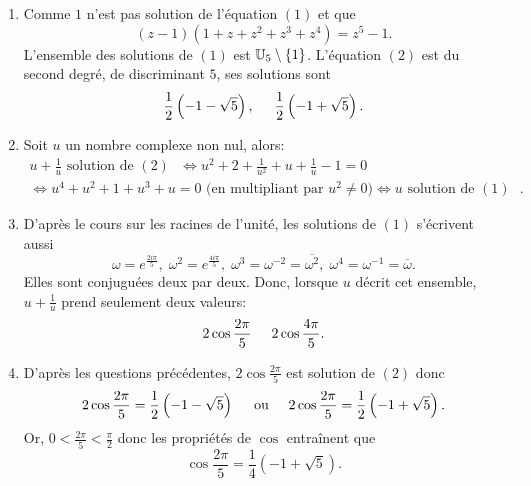\begin{enumerate}
  \item Comme $1$ n'est pas solution de l'équation $(1)$ et que
\begin{displaymath}
  (z-1)(1+z+z^2+z^3+z^4)=z^5 - 1.
\end{displaymath}
L'ensemble des solutions de $(1)$ est $\mathbb{U}_5 \setminus\{1\}$.\newline
L'équation $(2)$ est du second degré, de discriminant $5$, ses solutions sont
\begin{displaymath}
  \frac{1}{2}\left(-1-\sqrt{5} \right),\hspace{0.5cm} \frac{1}{2}\left(-1+\sqrt{5} \right).
\end{displaymath}

  \item Soit $u$ un nombre complexe non nul, alors:
\begin{multline*}
u+\frac{1}{u}\text{ solution de $(2)$ }
\Leftrightarrow
u^2+2+\frac{1}{u^2}+u+\frac{1}{u}-1=0 \\
\Leftrightarrow u^4 +u^2+ 1 + u^3 +u =0 \text{ (en multipliant par }u^2\neq 0) 
\Leftrightarrow u\text{ solution de $(1)$ }.
\end{multline*}

  \item D'après le cours sur les racines de l'unité, les solutions de $(1)$ s'écrivent aussi
  \begin{displaymath}
    \omega = e^{\frac{2i\pi}{5}},\; \omega^2= e^{\frac{4i\pi}{5}},\; \omega^3=\omega^{-2}=\overline{\omega^2},\; \omega^4=\omega^{-1}=\overline{\omega}.
  \end{displaymath}
Elles sont conjuguées deux par deux. Donc, lorsque $u$ décrit cet ensemble, $u+\frac{1}{u}$ prend seulement deux valeurs:
\begin{displaymath}
  2\cos \frac{2\pi}{5}\hspace{0.5cm} 2\cos \frac{4\pi}{5}.
\end{displaymath}

  \item D'après les questions précédentes, $2\cos \frac{2\pi}{5}$ est solution de $(2)$ donc
\begin{displaymath}
  2\cos \frac{2\pi}{5}=\frac{1}{2}\left(-1-\sqrt{5} \right)\hspace{0.5cm}\text{ou}\hspace{0.5cm} 
  2\cos \frac{2\pi}{5}=\frac{1}{2}\left(-1+\sqrt{5} \right).
\end{displaymath}
Or, $0 < \frac{2\pi}{5} < \frac{\pi}{2}$ donc les propriétés de $\cos$ entraînent que 
\begin{displaymath}
  \cos \frac{2\pi}{5}=\frac{1}{4}\left(-1+\sqrt{5} \right).
\end{displaymath}

\end{enumerate}
